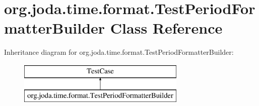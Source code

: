 \hypertarget{classorg_1_1joda_1_1time_1_1format_1_1_test_period_formatter_builder}{\section{org.\-joda.\-time.\-format.\-Test\-Period\-Formatter\-Builder Class Reference}
\label{classorg_1_1joda_1_1time_1_1format_1_1_test_period_formatter_builder}
}
Inheritance diagram for org.\-joda.\-time.\-format.\-Test\-Period\-Formatter\-Builder\-:\begin{figure}[H]
\begin{center}
\leavevmode
\includegraphics[height=2.000000cm]{classorg_1_1joda_1_1time_1_1format_1_1_test_period_formatter_builder}
\end{center}
\end{figure}
